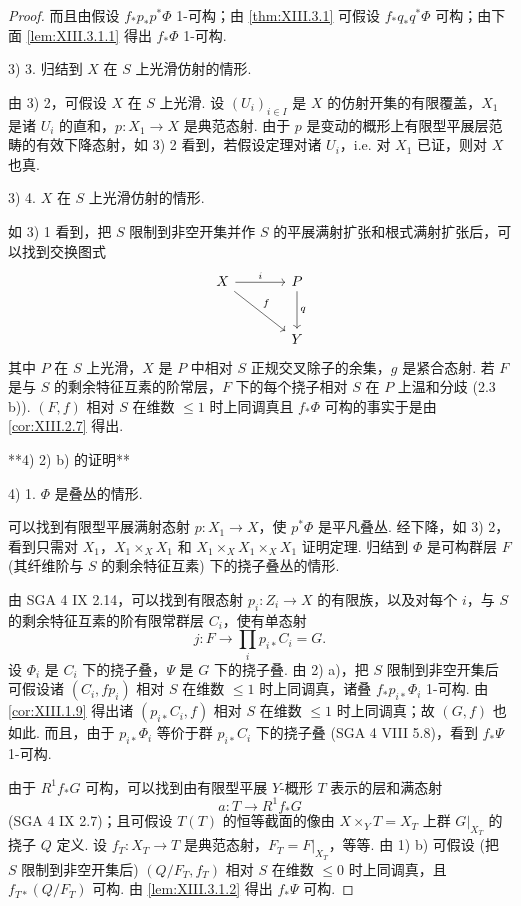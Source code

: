 \begin{proof}
而且由假设 $f_* p_* p^{*} \Phi$ 1-可构；由 \ref{thm:XIII.3.1} 可假设 $f_* q_* q^{*} \Phi$ 可构；由下面 \ref{lem:XIII.3.1.1} 得出 $f_* \Phi$ 1-可构.

3) 3. 归结到 $X$ 在 $S$ 上光滑仿射的情形.

由 3) 2，可假设 $X$ 在 $S$ 上光滑. 设 $(U_i)_{i \in I}$ 是 $X$ 的仿射开集的有限覆盖，$X_1$ 是诸 $U_i$ 的直和，$p \colon X_1 \to X$ 是典范态射. 由于 $p$ 是变动的概形上有限型平展层范畴的有效下降态射，如 3) 2 看到，若假设定理对诸 $U_i$，i.e. 对 $X_1$ 已证，则对 $X$ 也真.

3) 4. $X$ 在 $S$ 上光滑仿射的情形.

如 3) 1 看到，把 $S$ 限制到非空开集并作 $S$ 的平展满射扩张和根式满射扩张后，可以找到交换图式
\[
\begin{tikzcd}[row sep=large, column sep=large]
X \arrow[r,"{i}"] \arrow[dr,"{f}"] & P \arrow[d,"{q}"] \\
& Y
\end{tikzcd}
\]
其中 $P$ 在 $S$ 上光滑，$X$ 是 $P$ 中相对 $S$ 正规交叉除子的余集，$g$ 是紧合态射. 若 $F$ 是与 $S$ 的剩余特征互素的阶常层，$F$ 下的每个挠子相对 $S$ 在 $P$ 上温和分歧 (2.3 b)). $(F, f)$ 相对 $S$ 在维数 $\leqslant 1$ 时上同调真且 $f_* \Phi$ 可构的事实于是由 \ref{cor:XIII.2.7} 得出.

**4) 2) b) 的证明**

4) 1. $\Phi$ 是叠丛的情形.

可以找到有限型平展满射态射 $p \colon X_1 \to X$，使 $p^{*} \Phi$ 是平凡叠丛. 经下降，如 3) 2，看到只需对 $X_1$，$X_1 \times_X X_1$ 和 $X_1 \times_X X_1 \times_X X_1$ 证明定理. 归结到 $\Phi$ 是可构群层 $F$ (其纤维阶与 $S$ 的剩余特征互素) 下的挠子叠丛的情形.

由 SGA 4 IX 2.14，可以找到有限态射 $p_i \colon Z_i \to X$ 的有限族，以及对每个 $i$，与 $S$ 的剩余特征互素的阶有限常群层 $C_i$，使有单态射
\[
j \colon F \longrightarrow \prod_i p_{i*} C_i = G.
\]
设 $\Phi_i$ 是 $C_i$ 下的挠子叠，$\Psi$ 是 $G$ 下的挠子叠. 由 2) a)，把 $S$ 限制到非空开集后可假设诸 $(C_i, fp_i)$ 相对 $S$ 在维数 $\leqslant 1$ 时上同调真，诸叠 $f_* p_{i*} \Phi_i$ 1-可构. 由 \ref{cor:XIII.1.9} 得出诸 $(p_{i*} C_i, f)$ 相对 $S$ 在维数 $\leqslant 1$ 时上同调真；故 $(G, f)$ 也如此. 而且，由于 $p_{i*} \Phi_i$ 等价于群 $p_{i*} C_i$ 下的挠子叠 (SGA 4 VIII 5.8)，看到 $f_* \Psi$ 1-可构.

由于 $R^1 f_* G$ 可构，可以找到由有限型平展 $Y$-概形 $T$ 表示的层和满态射
\[
a \colon T \longrightarrow R^1 f_* G
\]
(SGA 4 IX 2.7)；且可假设 $T(T)$ 的恒等截面的像由 $X \times_Y T = X_T$ 上群 $G|_{X_T}$ 的挠子 $Q$ 定义. 设 $f_T \colon X_T \to T$ 是典范态射，$F_T = F|_{X_T}$，等等. 由 1) b) 可假设 (把 $S$ 限制到非空开集后) $(Q/F_T, f_T)$ 相对 $S$ 在维数 $\leqslant 0$ 时上同调真，且 $f_{T*}(Q/F_T)$ 可构. 由 \ref{lem:XIII.3.1.2} 得出 $f_* \Psi$ 可构.


\end{proof}
